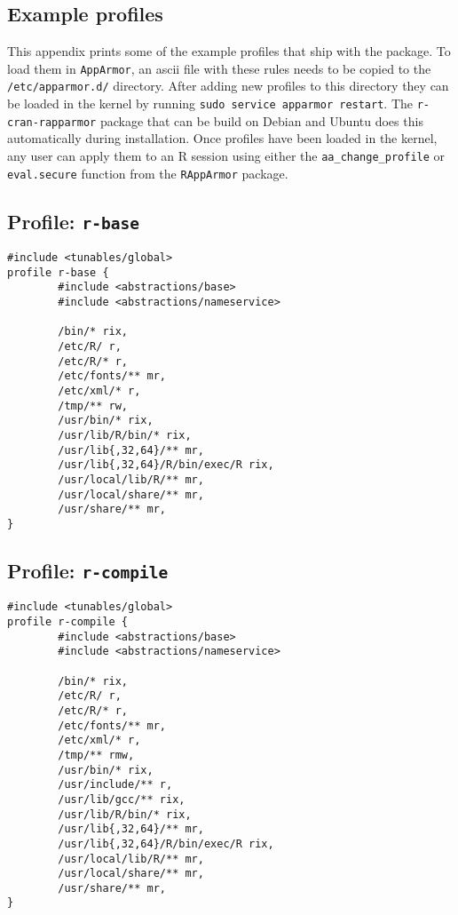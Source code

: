 \documentclass{jss}
\newcommand{\R}{\textsf{R}\xspace}
\newcommand{\AppArmor}{\texttt{AppArmor}\xspace}
\newcommand{\RAppArmor}{\pkg{RAppArmor}\xspace}
\begin{document}
\begin{appendices}
\section{Example profiles}

This appendix prints some of the example profiles that ship with the \RAppArmor
package. To load them in \AppArmor, an ascii file with these rules needs to be
copied to the \texttt{/etc/apparmor.d/} directory. After adding new profiles to
this directory they can be loaded in the kernel by running \texttt{sudo service
apparmor restart}. The \texttt{r-cran-rapparmor} package that can be build on
Debian and Ubuntu does this automatically during installation. Once profiles
have been loaded in the kernel, any user can apply them to an \R session using
either the \texttt{aa\_change\_profile} or \texttt{eval.secure} function from
the \texttt{RAppArmor} package.

\subsection[Profile: r-base]{Profile: \texttt{r-base}}
\label{r-base}

\begin{verbatim}
#include <tunables/global>
profile r-base {
        #include <abstractions/base>
        #include <abstractions/nameservice>

        /bin/* rix,
        /etc/R/ r,
        /etc/R/* r,
        /etc/fonts/** mr,
        /etc/xml/* r,
        /tmp/** rw,
        /usr/bin/* rix,
        /usr/lib/R/bin/* rix,
        /usr/lib{,32,64}/** mr,
        /usr/lib{,32,64}/R/bin/exec/R rix,
        /usr/local/lib/R/** mr,
        /usr/local/share/** mr,
        /usr/share/** mr,
}
\end{verbatim}


\subsection[Profile: r-compile]{Profile: \texttt{r-compile}}
\label{r-compile}

\begin{verbatim}
#include <tunables/global>
profile r-compile {
        #include <abstractions/base>
        #include <abstractions/nameservice>

        /bin/* rix,
        /etc/R/ r,
        /etc/R/* r,
        /etc/fonts/** mr,
        /etc/xml/* r,
        /tmp/** rmw,
        /usr/bin/* rix,
        /usr/include/** r,
        /usr/lib/gcc/** rix,		
        /usr/lib/R/bin/* rix,
        /usr/lib{,32,64}/** mr,
        /usr/lib{,32,64}/R/bin/exec/R rix,
        /usr/local/lib/R/** mr,
        /usr/local/share/** mr,
        /usr/share/** mr,
}
\end{verbatim}


\end{appendices}
\end{document}
